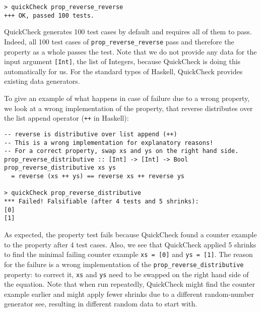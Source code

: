 \begin{footnotesize}
\begin{verbatim}
> quickCheck prop_reverse_reverse
+++ OK, passed 100 tests.
\end{verbatim}
\end{footnotesize}

QuickCheck generates 100 test cases by default and requires all of them to pass. Indeed, all 100 test cases of \texttt{prop\_reverse\_reverse} pass and therefore the property as a whole passes the test. Note that we do not provide any data for the input argument \texttt{[Int]}, the list of Integers, because QuickCheck is doing this automatically for us. For the standard types of Haskell, QuickCheck provides existing data generators.

To give an example of what happens in case of failure due to a  wrong property, we look at a wrong implementation of the property, that reverse distributes over the list append operator (\texttt{++} in Haskell):

\begin{footnotesize}
\begin{verbatim}
-- reverse is distributive over list append (++)
-- This is a wrong implementation for explanatory reasons!
-- For a correct property, swap xs and ys on the right hand side.
prop_reverse_distributive :: [Int] -> [Int] -> Bool
prop_reverse_distributive xs ys 
  = reverse (xs ++ ys) == reverse xs ++ reverse ys
  
> quickCheck prop_reverse_distributive
*** Failed! Falsifiable (after 4 tests and 5 shrinks):    
[0]
[1]
\end{verbatim}
\end{footnotesize}

As expected, the property test fails because QuickCheck found a counter example to the property after 4 test cases. Also, we see that QuickCheck applied 5 shrinks to find the minimal failing counter example \texttt{xs = [0]} and \texttt{ys = [1]}. The reason for the failure is a wrong implementation of the \texttt{prop\_reverse\_distributive} property: to correct it, \texttt{xs} and \texttt{ys} need to be swapped on the right hand side of the equation. Note that when run repeatedly, QuickCheck might find the counter example earlier and might apply fewer shrinks due to a different random-number generator see, resulting in different random data to start with.

